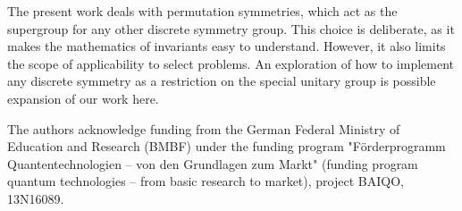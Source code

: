 \documentclass[%
 reprint,
 amsmath,amssymb,
 aps,
]{revtex4-2}
\theoremstyle{definition}%
\begin{document}
The present work deals with permutation symmetries, which act as the supergroup for any other discrete symmetry group. This choice is deliberate, as it makes the mathematics of invariants easy to understand. However, it also limits the scope of applicability to select problems. An exploration of how to implement any discrete symmetry as a restriction on the special unitary group is possible expansion of our work here. 



\begin{acknowledgements}
    The authors acknowledge funding from the German Federal Ministry of Education and Research (BMBF) under the funding program "Förderprogramm Quantentechnologien – von den Grundlagen zum Markt" (funding program quantum technologies – from basic research to market), project BAIQO, 13N16089.
\end{acknowledgements}



\appendix
\end{document}
